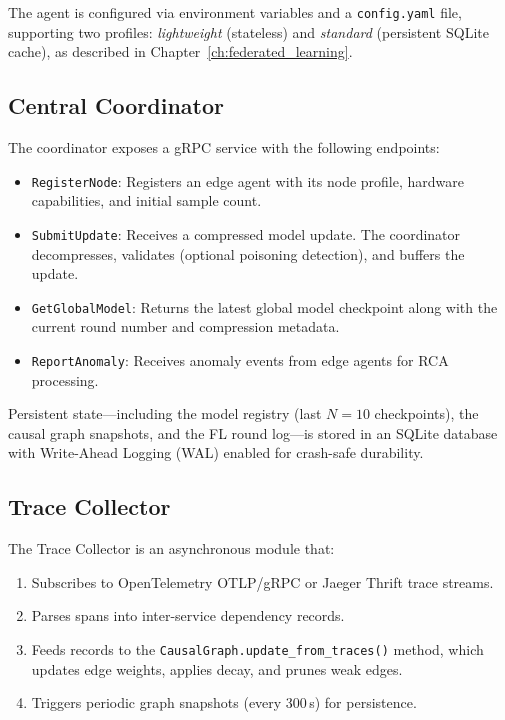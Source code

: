 The agent is configured via environment variables and a \texttt{config.yaml}
file, supporting two profiles: \emph{lightweight} (stateless) and
\emph{standard} (persistent SQLite cache), as described in
Chapter~\ref{ch:federated_learning}.

\subsection{Central Coordinator}
\label{subsec:design_coordinator}

The coordinator exposes a gRPC service with the following endpoints:

\begin{itemize}
    \item \texttt{RegisterNode}: Registers an edge agent with its node
    profile, hardware capabilities, and initial sample count.

    \item \texttt{SubmitUpdate}: Receives a compressed model update. The
    coordinator decompresses, validates (optional poisoning detection), and
    buffers the update.

    \item \texttt{GetGlobalModel}: Returns the latest global model checkpoint
    along with the current round number and compression metadata.

    \item \texttt{ReportAnomaly}: Receives anomaly events from edge agents
    for RCA processing.
\end{itemize}

Persistent state---including the model registry (last $N=10$ checkpoints), the
causal graph snapshots, and the FL round log---is stored in an SQLite database
with Write-Ahead Logging (WAL) enabled for crash-safe durability.

\subsection{Trace Collector}
\label{subsec:design_trace_collector}

The Trace Collector is an asynchronous module that:

\begin{enumerate}
    \item Subscribes to OpenTelemetry OTLP/gRPC or Jaeger Thrift trace
    streams.

    \item Parses spans into inter-service dependency records.

    \item Feeds records to the \texttt{CausalGraph.update\_from\_traces()}
    method, which updates edge weights, applies decay, and prunes weak edges.

    \item Triggers periodic graph snapshots (every 300\,s) for persistence.
\end{enumerate}

